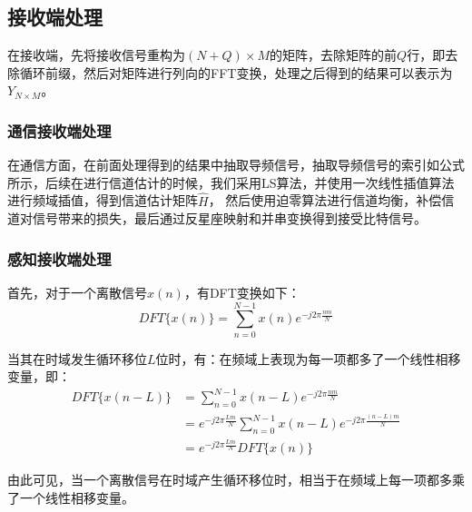 \documentclass[12pt, a4paper, oneside]{ctexart}
\begin{document}
\subsection*{\heiti{} 接收端处理}
在接收端，先将接收信号重构为$(N+Q)\times M$的矩阵，去除矩阵的前$Q$行，即去除循环前缀，然后对矩阵进行列向的FFT变换，处理之后得到的结果可以表示为$Y_{N\times M}$。
\subsubsection*{\heiti{} 通信接收端处理}
在通信方面，在前面处理得到的结果中抽取导频信号，抽取导频信号的索引如公式所示，后续在进行信道估计的时候，我们采用LS算法，并使用一次线性插值算法进行频域插值，得到信道估计矩阵$\widehat{H}$，
然后使用迫零算法进行信道均衡，补偿信道对信号带来的损失，最后通过反星座映射和并串变换得到接受比特信号。
\subsubsection*{\heiti{} 感知接收端处理}
首先，对于一个离散信号$x(n)$，有DFT变换如下：
$$
DFT\{x(n)\}=\sum_{n=0}^{N-1}x(n)e^{-j2\pi \frac{nm}{N}}
$$

当其在时域发生循环移位$L$位时，有：在频域上表现为每一项都多了一个线性相移变量，即：
$$
\begin{aligned}
DFT\{x(n-L)\}&=\sum_{n=0}^{N-1}x(n-L)e^{-j2\pi \frac{nm}{N}} \\
&=e^{-j2\pi \frac{Lm}{N}}\sum_{n=0}^{N-1}x(n-L)e^{-j2\pi \frac{(n-L)m}{N}} \\
&=e^{-j2\pi \frac{Lm}{N}}DFT\{x(n)\}
\end{aligned}
$$

由此可见，当一个离散信号在时域产生循环移位时，相当于在频域上每一项都多乘了一个线性相移变量。
\end{document}
